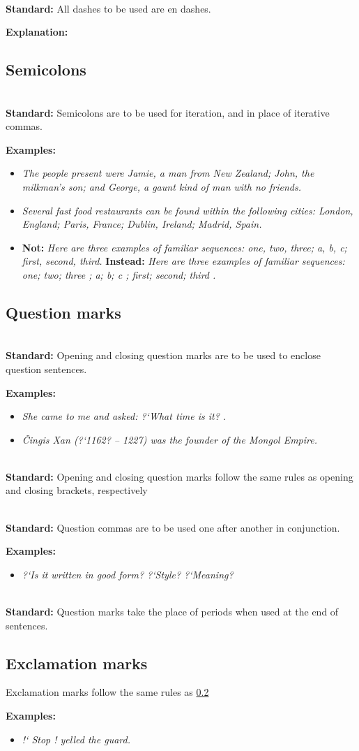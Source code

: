 \documentclass{article}
\newcommand{\standard}[1]{\quad  \\ \textbf{Standard:} {#1}}
\newcommand{\examples}[1]{
\textbf{Examples:} \begin{itemize}
#1
\end{itemize}
}
\newcommand{\example}[1]{\item \textit{#1}}
\newcommand{\nonexample}[2]{\item \textbf{Not:} \textit{#1} \textbf{Instead:}
  \textit{#2}}
\newcommand{\explanation}[1]{\textbf{Explanation:} #1}
\newcommand{\langlequote}{\guillemotleft}
\newcommand{\ranglequote}{\guillemotright}
\begin{document}
\standard{All dashes to be used are en dashes.}

\explanation{}

\subsection{Semicolons}

\standard{Semicolons are to be used for iteration, and in place of iterative
commas.}

\examples{
	\example{The people present were Jamie, a man from New Zealand; John, the
milkman's son; and George, a gaunt kind of man with no friends.}
	\example{Several fast food restaurants can be found within the following
cities: London, England; Paris, France; Dublin, Ireland; Madrid, Spain.}
	\nonexample{Here are three examples of familiar sequences: one, two, three;
a, b, c; first, second, third.}{Here are three examples of familiar sequences:
\langlequote one; two; three \ranglequote ; \langlequote a; b; c \ranglequote ;
\langlequote first; second; third \ranglequote .}
}

\subsection{Question marks}
\label{section:question_marks}

\standard{Opening and closing question marks are to be used to enclose
question sentences.}

\examples{
	\example{She came to me and asked: \langlequote ?`What time is it?
  \ranglequote.}
	\example{\v{C}ingis Xan (?`1162? -- 1227) was the founder of the Mongol Empire.}
}

\standard{Opening and closing question marks follow the same rules as opening
and closing brackets, respectively}

\standard{Question commas are to be used one after another in conjunction.}

\examples{
	\example{?`Is it written in good form? ?`Style? ?`Meaning?}
}

\standard{Question marks take the place of periods when used at the end of
sentences.}

\subsection{Exclamation marks}

Exclamation marks follow the same rules as \ref{section:question_marks}

\examples{
  \example{\langlequote !` Stop ! \ranglequote yelled the guard.}
}
\end{document}
